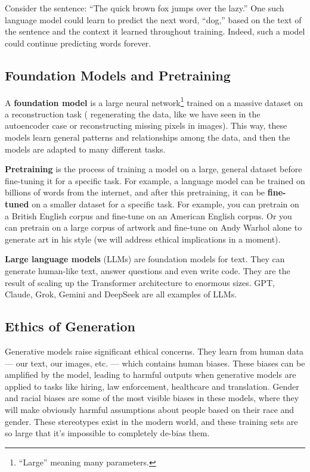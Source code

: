 Consider the sentence: ``The quick brown fox jumps over the lazy.'' One such language model could learn to predict the next word, ``dog,'' based on the text of the sentence and the context it learned throughout training. Indeed, such a model could continue predicting words forever.

\subsection*{Foundation Models and Pretraining}
A \textbf{foundation model} is a large neural network\footnote{``Large'' meaning many parameters.} trained on a massive dataset on a reconstruction task (\eg{} regenerating the data, like we have seen in the autoencoder case or reconstructing missing pixels in images). This way, these models learn general patterns and relationships among the data, and then the models are adapted to many different tasks.

\textbf{Pretraining} is the process of training a model on a large, general dataset before fine-tuning it for a specific task. For example, a language model can be trained on billions of words from the internet, and after this pretraining, it can be \textbf{fine-tuned} on a smaller dataset for a specific task. For example, you can pretrain on a British English corpus and fine-tune on an American English corpus. Or you can pretrain on a large corpus of artwork and fine-tune on Andy Warhol alone to generate art in his style (we will address ethical implications in a moment).

\textbf{Large language models} (LLMs) are foundation models for text. They can generate human-like text, answer questions and even write code. They are the result of scaling up the Transformer architecture to enormous sizes. GPT, Claude, Grok, Gemini and DeepSeek are all examples of LLMs.

\subsection*{Ethics of Generation}
Generative models raise significant ethical concerns. They learn from human data --- our text, our images, etc. --- which contains human biases. These biases can be amplified by the model, leading to harmful outputs when generative models are applied to tasks like hiring, law enforcement, healthcare and translation. Gender and racial biases are some of the most visible biases in these models, where they will make obviously harmful assumptions about people based on their race and gender. These stereotypes exist in the modern world, and these training sets are so large that it's impossible to completely de-bias them.

